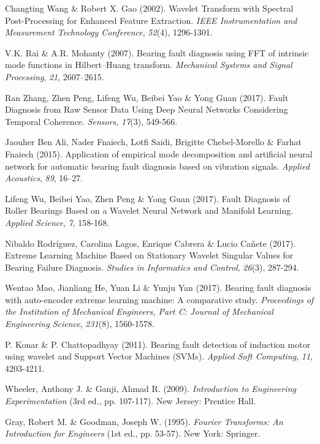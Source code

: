 \documentclass[12pt]{article}
\begin{document}
\begin{thebibliography}{9}
 Changting Wang \& Robert X. Gao (2002). Wavelet Transform with Spectral Post-Processing for
Enhanced Feature Extraction. \textit{IEEE Instrumentation and Measurement Technology Conference}, \textit{52}(4), 1296-1301.

 V.K. Rai \& A.R. Mohanty (2007). Bearing fault diagnosis using FFT of intrinsic mode functions in Hilbert–Huang transform. \textit{Mechanical Systems and Signal Processing}, \textit{21}, 2607–2615.

 Ran Zhang, Zhen Peng, Lifeng Wu, Beibei Yao \& Yong Guan (2017). Fault Diagnosis from Raw Sensor Data Using Deep Neural Networks Considering Temporal Coherence. \textit{Sensors}, \textit{17}(3), 549-566.

 Jaouher Ben Ali, Nader Fnaiech, Lotfi Saidi, Brigitte Chebel-Morello \& Farhat Fnaiech (2015). Application of empirical mode decomposition and artificial neural network for automatic bearing fault diagnosis based on vibration signals. \textit{Applied Acoustics}, \textit{89}, 16–27.

 Lifeng Wu, Beibei Yao, Zhen Peng \& Yong Guan (2017). Fault Diagnosis of Roller Bearings Based on a Wavelet Neural Network and Manifold Learning. \textit{Applied Science}, \textit{7}, 158-168. 

 Nibaldo Rodríguez, Carolina Lagos, Enrique Cabrera \& Lucio Cañete (2017). Extreme Learning Machine Based on Stationary Wavelet Singular Values for Bearing Failure Diagnosis. \textit{Studies in Informatics and Control}, \textit{26}(3), 287-294.

 Wentao Mao, Jianliang He, Yuan Li \& Yunju Yan (2017). Bearing fault diagnosis with auto-encoder extreme learning machine: A comparative study. \textit{Proceedings of the Institution of Mechanical Engineers, Part C: Journal of Mechanical Engineering Science}, \textit{231}(8), 1560-1578.

 P. Konar \& P. Chattopadhyay (2011). Bearing fault detection of induction motor using wavelet and Support Vector Machines (SVMs). \textit{Applied Soft Computing}, \textit{11}, 4203-4211.

 Wheeler, Anthony J. \& Ganji, Ahmad R. (2009). \textit{Introduction to Engineering Experimentation} (3rd ed., pp. 107-117). New Jersey: Prentice Hall.

 Gray, Robert M. \& Goodman, Joseph W. (1995). \textit{Fourier Transforms: An Introduction for Engineers} (1st ed., pp. 53-57). New York: Springer.


\end{thebibliography}
\end{document}
